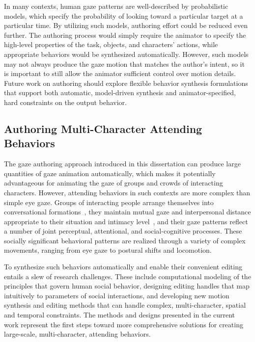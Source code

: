 In many contexts, human gaze patterns are well-described by probabilistic models, which specify the probability of looking toward a particular target at a particular time. By utilizing such models, authoring effort could be reduced even further. The authoring process would simply require the animator to specify the high-level properties of the task, objects, and characters' actions, while appropriate behaviors would be synthesized automatically. However, such models may not always produce the gaze motion that matches the author's intent, so it is important to still allow the animator sufficient control over motion details. Future work on authoring should explore flexible behavior synthesis formulations that support both automatic, model-driven synthesis and animator-specified, hard constraints on the output behavior.

\subsection{Authoring Multi-Character Attending Behaviors}

The gaze authoring approach introduced in this dissertation can produce large quantities of gaze animation automatically, which makes it potentially advantageous for animating the gaze of groups and crowds of interacting characters. However, attending behaviors in such contexts are more complex than simple eye gaze. Groups of interacting people arrange themselves into conversational formations~\citep{kendon2010spacing}, they maintain mutual gaze and interpersonal distance appropriate to their situation and intimacy level~\citep{argyle1965eyecontact}, and their gaze patterns reflect a number of joint perceptual, attentional, and social-cognitive processes. These socially significant behavioral patterns are realized through a variety of complex movements, ranging from eye gaze to postural shifts and locomotion.

To synthesize such behaviors automatically and enable their convenient editing entails a slew of research challenges. These include computational modeling of the principles that govern human social behavior, designing editing handles that map intuitively to parameters of social interactions, and developing new motion synthesis and editing methods that can handle complex, multi-character, spatial and temporal constraints. The methods and designs presented in the current work represent the first steps toward more comprehensive solutions for creating large-scale, multi-character, attending behaviors. 